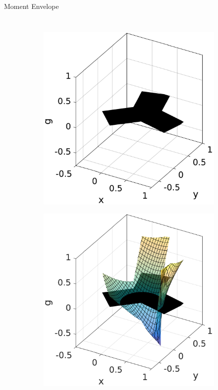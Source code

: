 \documentclass[10pt]{beamer}
\begin{document}
\begin{frame}{Moment Envelope}
\begin{columns}[c,onlytextwidth]
    \begin{figure}[t]
      \centering
      \begin{subfigure}[b]{0.49\textwidth}
        \centering
        \includegraphics[width=1\linewidth]{./fig/moment_hull_1}
        \caption{}
      \end{subfigure}
      \begin{subfigure}[b]{0.49\textwidth}
        \centering
        \includegraphics[width=1\linewidth]{fig/moment_hull_2}

\end{subfigure}
\end{figure}
\end{columns}
\end{frame}
\end{document}
